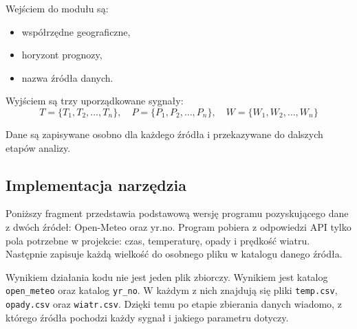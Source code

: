 \documentclass[a4paper,12pt]{article}
\begin{document}
\noindent
Wejściem do modułu są:
\begin{itemize}
    \item współrzędne geograficzne,
    \item horyzont prognozy,
    \item nazwa źródła danych.
\end{itemize}

\noindent
Wyjściem są trzy uporządkowane sygnały:
\[
T = \{T_1, T_2, \dots, T_n\}, \quad
P = \{P_1, P_2, \dots, P_n\}, \quad
W = \{W_1, W_2, \dots, W_n\}
\]

\noindent
Dane są zapisywane osobno dla każdego źródła i przekazywane do dalszych
etapów analizy.
\newpage
\subsection{Implementacja narzędzia}

Poniższy fragment przedstawia podstawową wersję programu pozyskującego dane
z dwóch źródeł: Open-Meteo oraz yr.no. Program pobiera z odpowiedzi API tylko
pola potrzebne w projekcie: czas, temperaturę, opady i prędkość wiatru.
Następnie zapisuje każdą wielkość do osobnego pliku w katalogu danego
źródła.

\noindent
Wynikiem działania kodu nie jest jeden plik zbiorczy. Wynikiem jest katalog
\texttt{open\_meteo} oraz katalog \texttt{yr\_no}. W każdym z nich znajdują
się pliki \texttt{temp.csv}, \texttt{opady.csv} oraz \texttt{wiatr.csv}.
Dzięki temu po etapie zbierania danych wiadomo, z którego źródła pochodzi
każdy sygnał i jakiego parametru dotyczy.
\end{document}
